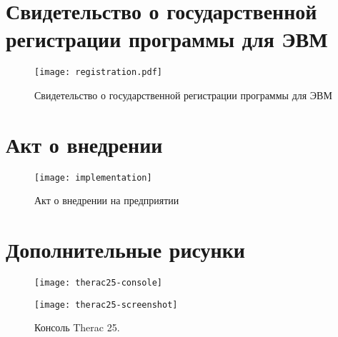 \chapter{Свидетельство о государственной регистрации программы для ЭВМ}\label{app:sec:registration}
\begin{center}
    \begin{figure}[hb]
        \texttt{[image: registration.pdf]}
        \caption{Свидетельство о государственной регистрации программы для ЭВМ}\label{app:fig:registration}
    \end{figure}
\end{center}



\chapter{Акт о внедрении}\label{app:sec:implementation}
\begin{center}
    \begin{figure}[hb]
        \texttt{[image: implementation]}
        \caption{Акт о внедрении на предприятии \leadingOrganizationTitle}\label{app:fig:implementation}
    \end{figure}
\end{center}

\chapter{Дополнительные рисунки}\label{app:sec:figures}
\begin{center}
    \begin{figure}[hb!]
        \texttt{[image: therac25-console]}
        \caption[Therac 25]{Therac 25. Консоль оператора показана на рисунке \ref{app:fig:therac25_console}.}\label{app:fig:therac25}
        \texttt{[image: therac25-screenshot]}
        \caption[Консоль Therac 25]{Консоль Therac 25.}\label{app:fig:therac25_console}
    \end{figure}
\end{center}

